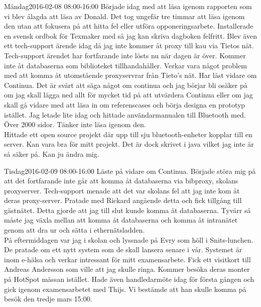 \documentclass[a4paper,oneside]{book}
\begin{document}
\begin{diary}{Måndag}{2016-02-08 08:00-16:00}
	Började idag med att läsa igenom rapporten som vi blev ålagda att läsa av Donald. Det tog ungefär tre timmar att läsa igenom den utan att fokusera på att hitta fel eller utföra opponeringsarbete. Installerade en svensk ordbok för Texmaker med så jag kan skriva dagboken felfritt. Blev även ett tech-support ärende idag då jag inte kommer åt proxy till kau via Tietos nät.\\
	Tech-support ärendet har fortfarande inte lösts nu när dagen är över. Kommer inte åt databaserna som biblioteket tillhandahåller. Verkar vara något problem med att komma åt utomstående proxyservrar från Tieto's nät. Har läst vidare om Continua. Det är svårt att säga något om continua och jag börjar bli osäker på om jag skall lägga ned allt för mycket tid på att utvärdera Continua eller om jag skall gå vidare med att läsa in om referenscases och börja designa en prototyp istället. Jag letade lite idag och hittade användarmanualen till Bluetooth med. Över 2000 sidor. Tänker inte läsa igenom den.\\
	Hittade ett open source projekt där upp till sju bluetooth-enheter kopplar till en server. Kan vara bra för mitt projekt. Det är dock skrivet i java vilket jag inte är så säker på. Kan ju ändra mig.
\end{diary}

\begin{diary}{Tisdag}{2016-02-09 08:00-16:00}
	Läste på vidare om Continua. Började störa mig på att det fortfarande inte går att komma åt databaserna via bibproxy, skolans proxyserver. Tech-support menade att det var skolans fel att jag inte kom åt deras proxy-server. Pratade med Rickard angående detta och fick tillgång till gästnätet. Detta gjorde att jag till slut kunde komma åt databaserna. Tyvärr så måste jag växla mellan att komma åt databaserna och komma åt intranätet genom att dra ur och sätta i ethernätsladden.\\
	På eftermiddagen var jag i skolan och lyssnade på Evry som höll i Snits-lunchen. De pratade om ett nytt system som de skall lansera senare i vår. Systemet är inom e-hälsa och verkar intressant för mitt examensarbete. Fick ett visitkort till Andreas Andersson som ville att jag skulle ringa. Kommer besöka deras monter på HotSpot mässan istället. Hade även handledarmöte idag för första gången och gick igenom examensarbetet med Thijs. Vi bestämde att han skulle komma på besök den tredje mars 15:00.
\end{diary}
\end{document}
